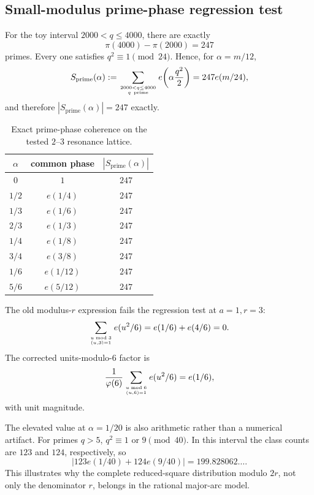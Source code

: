 \subsection{Small-modulus prime-phase regression test}
\label{subsec:numerical-prime-resonance}

For the toy interval $2000<q\le4000$, there are exactly
\begin{equation}
 \pi(4000)-\pi(2000)=247
 \label{eq:toy-prime-count}
\end{equation}
primes.  Every one satisfies $q^2\equiv1\pmod{24}$.  Hence, for $\alpha=m/12$,
\begin{equation}
 S_{\mathrm{prime}}(\alpha)
 :=\sum_{2000<q\le4000\atop q\ {\rm prime}}
 e\!\left(\alpha\frac{q^2}{2}\right)
 =247e(m/24),
 \label{eq:toy-prime-resonance}
\end{equation}
and therefore $|S_{\mathrm{prime}}(\alpha)|=247$ exactly.

\begin{table}[htbp]
\centering
\caption{Exact prime-phase coherence on the tested $2$--$3$ resonance lattice.}
\label{tab:toy-prime-resonance}
\small
\begin{tabular}{ccc}
\toprule
$\alpha$ & common phase & $|S_{\mathrm{prime}}(\alpha)|$\\
\midrule
$0$ & $1$ & $247$\\
$1/2$ & $e(1/4)$ & $247$\\
$1/3$ & $e(1/6)$ & $247$\\
$2/3$ & $e(1/3)$ & $247$\\
$1/4$ & $e(1/8)$ & $247$\\
$3/4$ & $e(3/8)$ & $247$\\
$1/6$ & $e(1/12)$ & $247$\\
$5/6$ & $e(5/12)$ & $247$\\
\bottomrule
\end{tabular}
\end{table}

The old modulus-$r$ expression fails the regression test at $a=1,r=3$:
\begin{equation}
 \sum_{u\bmod3\atop(u,3)=1}e(u^2/6)=e(1/6)+e(4/6)=0.
 \label{eq:old-r3-regression-failure}
\end{equation}
The corrected units-modulo-$6$ factor is
\begin{equation}
 \frac1{\varphi(6)}
 \sum_{u\bmod6\atop(u,6)=1}e(u^2/6)
 =e(1/6),
 \label{eq:correct-r3-regression}
\end{equation}
with unit magnitude.

The elevated value at $\alpha=1/20$ is also arithmetic rather than a numerical artifact.  For primes $q>5$, $q^2\equiv1$ or $9\pmod{40}$.  In this interval the class counts are $123$ and $124$, respectively, so
\begin{equation}
 \left|123e(1/40)+124e(9/40)\right|
 =199.828062\ldots.
 \label{eq:one-twentieth-secondary-resonance}
\end{equation}
This illustrates why the complete reduced-square distribution modulo $2r$, not only the denominator $r$, belongs in the rational major-arc model.
